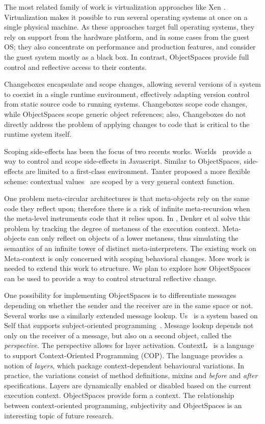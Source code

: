 The most related family of work is virtualization approaches like Xen \cite{Chis07xen}. Virtualization makes it possible to run several operating systems at once on a single physical machine. As these approaches target full operating systems, they rely on support from the hardware platform, and in some cases from the guest OS; they also concentrate on performance and production features, and consider the guest system mostly as a black box. In contrast, ObjectSpaces provide full control and reflective access to their contents.

Changeboxes \cite{Denk07c} encapsulate and scope changes, allowing several versions of a system to coexist in a single runtime environment, effectively adapting version control from static source code to running systems. Changeboxes scope code changes, while ObjectSpaces scope generic object references; also, Changeboxes do not directly address the problem of applying changes to code that is critical to the runtime system itself.

Scoping side-effects has been the focus of two recents works. Worlds~\cite{Wart08a} provide a way to control and scope side-effects in Javascript. Similar to
ObjectSpaces, side-effects are limited to a first-class environment.  Tanter proposed a more flexible scheme: contextual values~\cite{Tant08b} are scoped 
by a very general context function.

One problem meta-circular architectures is that meta-objects rely on the same code they reflect upon; therefore there is a risk of infinite meta-recursion when the meta-level instruments code that it relies upon.
In \cite{Denk08b}, Denker et al solve this problem by tracking the degree of metaness of the execution context. Meta-objects can only reflect on objects of a lower metaness, thus simulating the semantics of an infinite tower of distinct meta-interpreters. The existing work on Meta-context is only concerned with scoping behavioral changes. More work is needed to extend this work to structure. We plan to explore how ObjectSpaces can be used to provide a way to control structural reflective change.

One possibility for implementing ObjectSpaces is to differentiate messages depending on whether the sender and the receiver are in the same space or not. Several works use a similarly extended message lookup.
%
Us~\cite{Smit96a} is a system based on Self that supports subject-oriented
programming~\cite{Harr93a}. Message lookup depends not only on the receiver of a
message, but also on a second object, called the \emph{perspective}.
The perspective allows for layer activation.
ContextL~\cite{Cost05a, Hirs08a} is a language to support Context-Oriented 
Programming (COP). The language provides a notion of \emph{layers}, which
package context-dependent behavioural variations. In practice, the variations
consist of method definitions, mixins and \emph{before} and \emph{after}
specifications. Layers are dynamically enabled or disabled based on the current
execution context. ObjectSpaces provide form a context. The relationship between
context-oriented programming, subjectivity and ObjectSpaces is an interesting
topic of future research.

